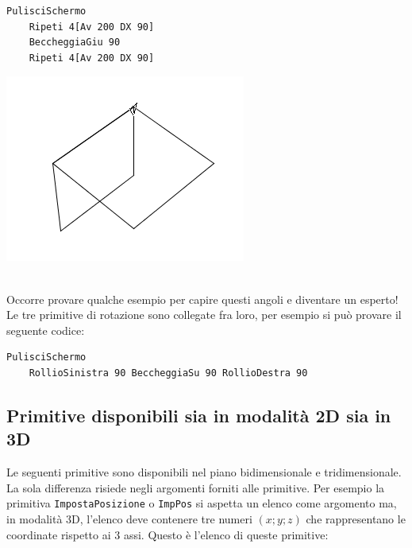 	\begin{lstlisting}[caption="Due quadrati in 3D"]
	PulisciSchermo
	Ripeti 4[Av 200 DX 90] 
	BeccheggiaGiu 90
	Ripeti 4[Av 200 DX 90] 
	\end{lstlisting}
	\begin{minipage}{10cm}
		\begin{center}
			\includegraphics*[scale=0.4]{pics/perspective1.png}
		\end{center}
	\end{minipage}
	\\
	Occorre provare qualche esempio per capire questi angoli e diventare un esperto!\\
	Le tre primitive di rotazione sono collegate fra loro, per esempio si può provare il seguente codice:\\
	\begin{lstlisting}[caption="Movimento della tartaruga in 3D equivalente a \texttt{Sinistra~90}."]
	PulisciSchermo
	RollioSinistra 90 BeccheggiaSu 90 RollioDestra 90
	\end{lstlisting}


	\subsection{Primitive disponibili sia in modalità 2D sia in 3D}
	Le seguenti primitive sono disponibili nel piano bidimensionale e tridimensionale. La sola differenza risiede negli argomenti forniti alle primitive. Per esempio la primitiva \texttt{ImpostaPosizione} o \texttt{ImpPos} si aspetta un elenco come argomento ma, in modalità 3D, l'elenco deve contenere tre numeri $(x;y;z)$ che rappresentano le coordinate rispetto ai 3 assi. Questo è l'elenco di queste primitive:\\

